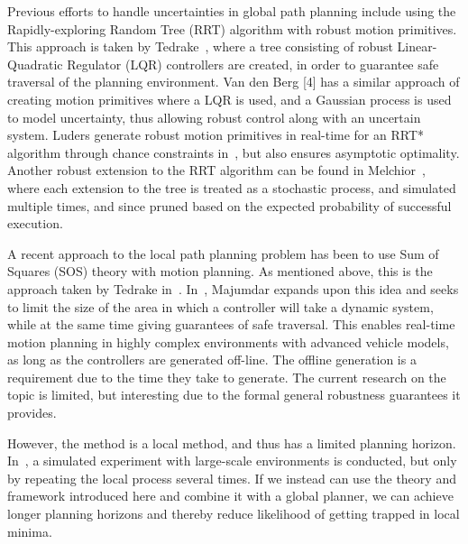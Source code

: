 Previous efforts to handle uncertainties in global path
planning include using the Rapidly-exploring Random Tree
(RRT) algorithm with robust motion primitives. This approach
is taken by Tedrake~\cite{tedrakeLQRtreesFeedbackMotion2009}, where a tree consisting of robust
Linear-Quadratic Regulator (LQR) controllers are created, in
order to guarantee safe traversal of the planning environment.
Van den Berg [4] has a similar approach of creating motion
primitives where a LQR is used, and a Gaussian process
is used to model uncertainty, thus allowing robust control
along with an uncertain system. Luders generate robust motion
primitives in real-time for an RRT* algorithm through chance
constraints in~\cite{luders2013robust}, but also ensures asymptotic optimality.
Another robust extension to the RRT algorithm can be found
in Melchior~\cite{melchior2007particle}, where each extension to the tree is treated
as a stochastic process, and simulated multiple times, and
since pruned based on the expected probability of successful
execution.

A recent approach to the local path planning problem
has been to use Sum of Squares (SOS) theory with motion
planning. As mentioned above, this is the approach taken by
Tedrake in~\cite{tedrakeLQRtreesFeedbackMotion2009}. In~\cite{majumdarFunnelLibrariesRealtime2017}, Majumdar expands upon this idea and
seeks to limit the size of the area in which a controller will take
a dynamic system, while at the same time giving guarantees
of safe traversal. This enables real-time motion planning in
highly complex environments with advanced vehicle models,
as long as the controllers are generated off-line. The offline generation is a requirement due to the time they take
to generate. The current research on the topic is limited, but
interesting due to the formal general robustness guarantees it
provides.

However, the method is a local method, and thus has a
limited planning horizon. In~\cite{majumdarFunnelLibrariesRealtime2017}, a simulated experiment with
large-scale environments is conducted, but only by repeating
the local process several times. If we instead can use the theory
and framework introduced here and combine it with a global
planner, we can achieve longer planning horizons and thereby
reduce likelihood of getting trapped in local minima.

